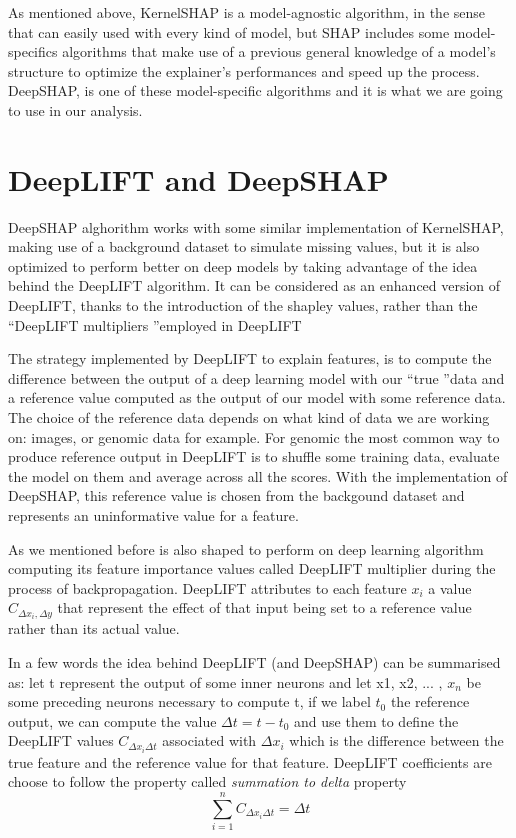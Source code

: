 \documentclass[10pt]{report}
\begin{document}

As mentioned above, KernelSHAP is a model-agnostic algorithm, in the sense that can easily used with every kind of model, but SHAP includes some model-specifics algorithms that make use of a previous general knowledge of a model's structure to optimize the explainer's performances and speed up the process. DeepSHAP, is one of these model-specific algorithms and it is what we are going to use in our analysis.

\section{DeepLIFT and DeepSHAP}
DeepSHAP alghorithm works with some similar implementation of KernelSHAP, making use of a background dataset to simulate missing values, but it is also optimized to perform better on deep models by taking advantage of the idea behind the DeepLIFT algorithm.
It can be considered as an enhanced version of DeepLIFT, thanks to the introduction of the shapley values, rather than the \textquotedblleft DeepLIFT multipliers \textquotedblright employed in DeepLIFT

The strategy implemented by DeepLIFT to explain features, is to compute the difference between the output of a deep learning model with our \textquotedblleft true  \textquotedblright data and a reference value computed as the output of our model with some reference data.
The choice of the reference data depends on what kind of data we are working on: images, or genomic data for example.
For genomic the most common way to produce reference output in DeepLIFT is to shuffle some training data, evaluate the model on them and average across all the scores.
With the implementation of DeepSHAP, this reference value is chosen from the backgound dataset and represents an uninformative value for a feature.

As we mentioned before is also shaped to perform on deep learning algorithm computing its feature importance values called DeepLIFT multiplier during the process of backpropagation.
DeepLIFT attributes to each feature $x_i$ a value $C_{\Delta x_i, \Delta y}$ that represent the effect of that input being set to a reference value rather than its actual value.

In a few words the idea behind DeepLIFT (and DeepSHAP) can be summarised as: let t represent the output of some inner neurons and let x1, x2, ... , $x_n$ be some preceding neurons necessary to compute t, if we label $t_0$ the reference output, we can compute the value $\Delta t = t-t_0$ and use them to define the DeepLIFT values $C_{\Delta x_i \Delta t}$ associated with $\Delta x_i$ which is the difference between the true feature and the reference value for that feature.
DeepLIFT coefficients are choose to follow the property called \emph{summation to delta} property
\[
\sum_{i = 1} ^n C_{\Delta x_i \Delta t} = \Delta t
\]
\end{document}
